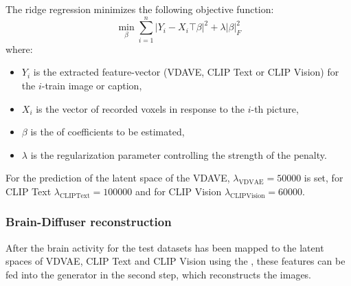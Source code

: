 The ridge regression minimizes the following objective function:
\[
\min_{\beta} \sum_{i=1}^{n} {|Y_i - X_i\top \beta|}^2 + \lambda |\beta|^2_F
\]
where:
\begin{itemize}
    \item \(Y_i\) is the extracted  feature-vector (VDAVE, CLIP Text or CLIP Vision) for the \(i\)-train image or caption,
    \item \(X_i\) is the vector of recorded voxels in response to the \(i\)-th picture,
    \item \(\beta\) is the  of coefficients to be estimated,
    \item \(\lambda\) is the regularization parameter controlling the strength of the penalty.
\end{itemize}

For the prediction of the latent space of the VDAVE, $\lambda_{\mathrm{VDVAE}}=50000$ is set, for CLIP Text $\lambda_{\mathrm{CLIP Text}}=100000$ and for CLIP Vision $\lambda_{\mathrm{CLIP Vision}}=60000$. 

        

\subsubsection{Brain-Diffuser reconstruction}
After the brain activity for the test datasets has been mapped to the latent spaces of VDVAE, CLIP Text and CLIP Vision using the , these  features can be fed into the generator in the second step, which reconstructs the images.

